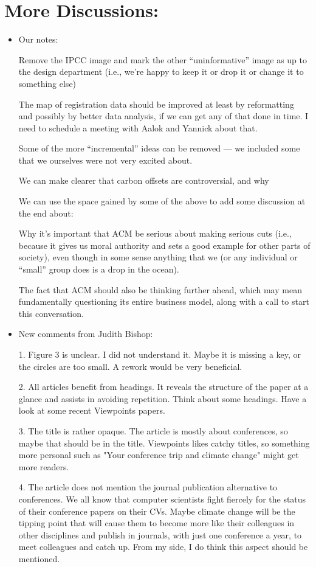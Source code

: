 \documentclass[12pt]{article}
\begin{document}
\section*{More Discussions:}
\begin{itemize}
\item Our notes:

Remove the IPCC image and mark the other “uninformative” image as up to the design department (i.e., we’re happy to keep it or drop it or change it to something else)

The map of registration data should be improved at least by reformatting and possibly by better data analysis, if we can get any of that done in time.  I need to schedule a meeting with Aalok and Yannick about that.

Some of the more “incremental” ideas can be removed — we included some that we ourselves were not very excited about.

We can make clearer that carbon offsets are controversial, and why

We can use the space gained by some of the above to add some discussion at the end about:

Why it’s important that ACM be serious about making serious cuts (i.e., because it gives us moral authority and sets a good example for other parts of society), even though in some sense anything that we (or any individual or “small” group does is a drop in the ocean).

The fact that ACM should also be thinking further ahead, which may mean fundamentally questioning its entire business model, along with a call to start this conversation.

\item New comments from Judith Bishop:

1. Figure 3 is unclear. I did not understand it. Maybe it is missing a key, or the circles are too small. A rework would be very beneficial.

2. All articles benefit from headings. It reveals the structure of the paper at a glance and assists in avoiding repetition. Think about some headings. Have a look at some recent Viewpoints papers.

3. The title is rather opaque. The article is mostly about conferences, so maybe that should be in the title. Viewpoints likes catchy titles, so something more personal such as "Your conference trip and climate change" might get more readers.

4. The article does not mention the journal publication alternative to conferences. We all know that computer scientists fight fiercely for the status of their conference papers on their CVs. Maybe climate change will be the tipping point that will cause them to become more like their colleagues in other disciplines and publish in journals, with just one conference a year, to meet colleagues and catch up. From my side, I do think this aspect should be mentioned.


\end{itemize}
\end{document}
